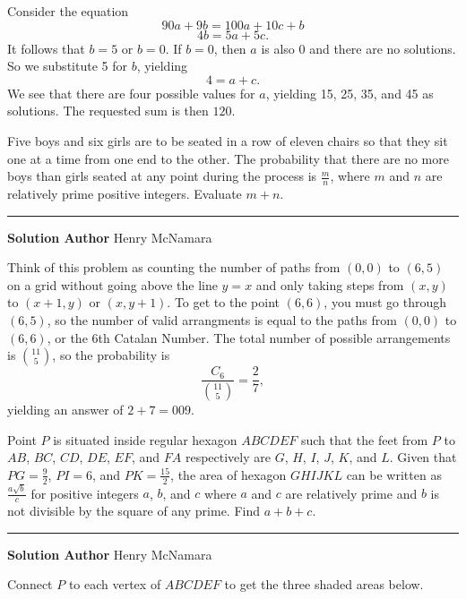 \documentclass[11pt]{scrartcl}
\newcommand*{\problemfont}{\sffamily\bfseries}
\begin{document}
Consider the equation
\[90a + 9b = 100a + 10c + b\]
\[4b = 5a + 5c.\]
It follows that $b = 5$ or $b = 0$. If $b = 0$, then $a$ is also 0 and there are no solutions. So we substitute 5 for $b$, yielding
\[4 = a + c.\]
We see that there are four possible values for $a$, yielding 15, 25, 35, and 45 as solutions. The requested sum is then $\boxed{120}$.

\pagebreak

\begin{problem}
    Five boys and six girls are to be seated in a row of eleven chairs so that they sit one at a time from one end to the other. The probability that there are no more boys than girls seated at any point during the process is $\frac{m}{n}$, where $m$ and $n$ are relatively prime positive integers. Evaluate $m + n$.
\end{problem}

\vspace{-\baselineskip}\rule{\textwidth}{0.4pt}

{\problemfont Solution Author} Henry McNamara

Think of this problem as counting the number of paths from $(0,0)$ to $(6,5)$ on a grid without going above the line $y = x$ and only taking steps from $(x,y)$ to $(x + 1,y)$ or $(x, y + 1)$. To get to the point $(6, 6)$, you must go through $(6, 5)$, so the number of valid arrangments is equal to the paths from $(0,0)$ to $(6,6)$, or the 6th Catalan Number. The total number of possible arrangements is ${11 \choose 5}$, so the probability is
\[\frac{C_{6}}{{11 \choose 5}} = \frac{2}{7},\]
yielding an answer of $2 + 7 = \boxed{009}$.

\pagebreak

\begin{problem}
    Point $P$ is situated inside regular hexagon $ABCDEF$ such that the feet from $P$ to $AB$, $BC$, $CD$, $DE$, $EF$, and $FA$ respectively are $G$, $H$, $I$, $J$, $K$, and $L$. Given that $PG = \frac{9}{2}$, $PI = 6$, and $PK = \frac{15}{2}$, the area of hexagon $GHIJKL$ can be written as $\frac{a\sqrt{b}}{c}$ for positive integers $a$, $b$, and $c$ where $a$ and $c$ are relatively prime and $b$ is not divisible by the square of any prime. Find $a + b + c$.
\end{problem}

\vspace{-\baselineskip}\rule{\textwidth}{0.4pt}

{\problemfont Solution Author} Henry McNamara

Connect $P$ to each vertex of $ABCDEF$ to get the three shaded areas below.
\end{document}
